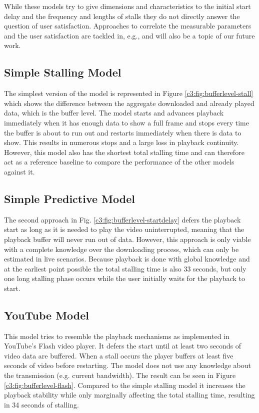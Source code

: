 While these models try to give dimensions and characteristics to the initial start delay and the frequency and lengths of stalls they do not directly answer the question of user satisfaction. Approaches to correlate the  measurable parameters and the user satisfaction are tackled in, e.g., \cite{ketyko2010qoe, mokmeasuring, gustafsson2008measmmmquality} and will also be a topic of our future work.



\subsection{Simple Stalling Model}

The simplest version of the model is represented in Figure \ref{c3:fig:bufferlevel-stall} which shows the difference between the aggregate downloaded and already played data, which is the buffer level. The model starts and advances playback immediately when it has enough data to show a full frame and stops every time the buffer is about to run out and restarts immediately when there is data to show. This results in numerous stops and a large loss in playback continuity. However, this model also has the shortest total stalling time and can therefore act as a reference baseline to compare the performance of the other models against it.


\subsection{Simple Predictive Model}

The second approach in Fig. \ref{c3:fig:bufferlevel-startdelay} defers the playback start as long as it is needed to play the video uninterrupted, meaning that the playback buffer will never run out of data. However, this approach is only viable with a complete knowledge over the downloading process, which can only be estimated in live scenarios. Because playback is done with global knowledge and at the earliest point possible the total stalling time is also 33 seconds, but only one long stalling phase occurs while the user initially waits for the playback to start.


\subsection{YouTube Model}

This model tries to resemble the playback mechanisms as implemented in YouTube's Flash video player.
It defers the start until at least two seconds of video data are buffered. When a stall occurs the player buffers at least five seconds of video before restarting. The model does not use any knowledge about the transmission (e.g. current bandwidth).
The result can be seen in Figure \ref{c3:fig:bufferlevel-flash}. Compared to the simple stalling model it increases the playback stability while only marginally affecting the total stalling time, resulting in 34 seconds of stalling.

